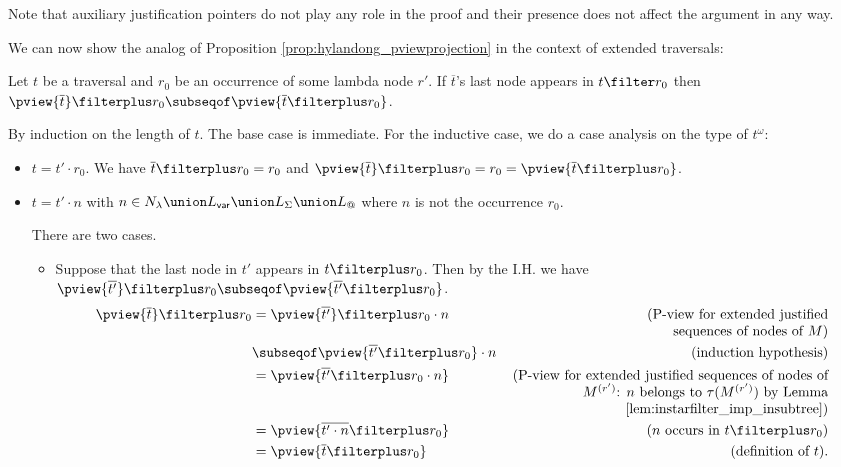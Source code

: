 Note that auxiliary justification pointers do not play any role in the proof
and their presence does not affect the argument in any way.
\smallskip

We can now show the analog of Proposition \ref{prop:hylandong_pviewprojection} in the context of extended traversals:
\begin{proposition}
\label{prop:analog_pviewprojection} Let $t$ be a traversal and $r_0$
be an occurrence of some lambda node $r'$.
If $\overline{t}$'s last node appears in $t\filter r_0$ then
 $\pview{ \overline{t}}  \filterplus r_0 \subseqof \pview{ \overline{t}\filterplus
 r_0}$.
\end{proposition}
\proof
By induction on the length of $t$. The base case is immediate. For the inductive case,
we do a case analysis on the type of $t^\omega$:
    \begin{itemize}
    \item $t =  t' \cdot r_0$. We have $\overline{t} \filterplus r_0 = r_0$ and 
     $\pview{\overline{t}} \filterplus r_0 = r_0 = \pview{\overline{t} \filterplus r_0}$.

    \item $t = t' \cdot n$ with $n \in N_\lambda \union L_{\sf var} \union
    L_\Sigma \union L_@$ where $n$ is not the occurrence $r_0$.
    
    There are two cases.
    \begin{itemize}
        \item Suppose that the last node in $t'$ appears in $t\filterplus r_0$. Then
        by the I.H. we have $\pview{\overline{t'}} \filterplus  r_0 \subseqof \pview{\overline{t'} \filterplus  r_0}$.
            \begin{align*}
            \pview{\overline{t}} \filterplus r_0
                &=  \pview{\overline{t'}} \filterplus r_0 \cdot n  & \parbox[t]{8cm}{(\raggedleft P-view for extended justified\\sequences of nodes of $M$)} \\
                &\subseqof  \pview{\overline{t'} \filterplus  r_0} \cdot n            & (\mbox{induction hypothesis}) \\
                &=  \pview{\overline{t'} \filterplus  r_0 \cdot n} & \parbox[t]{8cm}{\raggedleft (P-view for extended justified sequences of nodes of $M^{(r')}$: $n$ belongs to $\tau(M^{(r')})$ by Lemma \ref{lem:instarfilter_imp_insubtree})} \\
                &=  \pview{\overline{t' \cdot n} \filterplus  r_0  }   & (\mbox{$n$ occurs in $t\filterplus r_0$}) \\
                &= \pview{\overline{t} \filterplus  r_0  }     & (\mbox{definition of } t).
            \end{align*}
        

\end{itemize}
\end{itemize}
